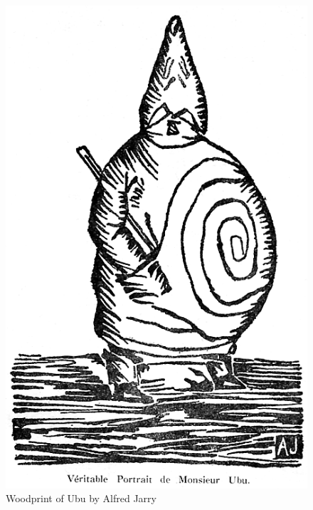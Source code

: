 \begin{figure}[h] %
  \centering
  \includegraphics[height=0.3\textheight]{images/ubu.png}
  \caption[Ubu]{Woodprint of Ubu by Alfred Jarry}
  \label{fig:UBU}
\end{figure}

